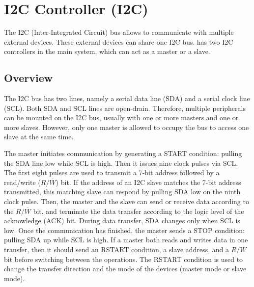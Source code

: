 \documentclass[main\_\_EN.tex]{subfiles}
\begin{document}
\setenglishformatting

\ifglobal
\else
    {\let\clearpage\relax \listoftodos}
    {\let\clearpage\relax \listofdonetodos}
    \tableofcontents
\fi






\hypertarget{i2c}{}
\chapter{I2C Controller (I2C)}
\label{mod:i2c}

The I2C (Inter-Integrated Circuit) bus allows \chipname{} to communicate with multiple external devices. These external devices can share one I2C bus.
\chipname{} has two I2C controllers in the main system, which can act as a master or a slave.


\section{Overview}
The I2C bus has two lines, namely a serial data line (SDA) and a serial clock line (SCL). Both SDA and SCL lines are open-drain. Therefore, multiple peripherals can be mounted on the I2C bus, usually with one or more masters and one or more slaves. However, only one master is allowed to occupy the bus to access one slave at the same time.

The master initiates communication by generating a START condition: pulling the SDA line low while SCL is high. Then it issues nine clock pulses via SCL. The first eight pulses are used to transmit a 7-bit address followed by a read/write ($R/\overline W$) bit. If the address of an I2C slave matches the 7-bit address transmitted, this matching slave can respond by pulling SDA low on the ninth clock pulse. Then, the master and the slave can send or receive data according to the $R/\overline W$ bit, and terminate the data transfer according to the logic level of the acknowledge (ACK) bit. During data transfer, SDA changes only when SCL is low. Once the communication has finished, the master sends a STOP condition: pulling SDA up while SCL is high. If a master both reads and writes data in one transfer, then it should send an RSTART condition, a slave address, and a $R/\overline W$ bit before switching between the operations. The RSTART condition is used to change the transfer direction and the mode of the devices (master mode or slave mode).
\end{document}
